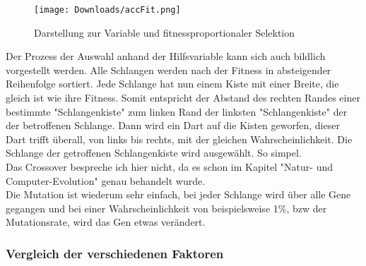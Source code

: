 \documentclass[11pt,a4paper,ngerman]{article}
\begin{document}
\begin{wrapfigure}{r}{0.5\textwidth} 
    \vspace{-20pt}
        \begin{center}
            \texttt{[image: Downloads/accFit.png]}
            \caption{Darstellung zur Variable  und fitnessproportionaler Selektion}
        \end{center}
    \vspace{-15pt}
\end{wrapfigure} 

Der Prozess der Auswahl anhand der Hilfsvariable  kann sich auch bildlich vorgestellt werden. Alle Schlangen werden nach der Fitness in absteigender Reihenfolge sortiert. Jede Schlange hat nun einem Kiste mit einer Breite, die gleich ist wie ihre Fitness. Somit entspricht der Abstand des rechten Randes einer bestimmte "Schlangenkiste" zum linken Rand der linksten "Schlangenkiste" der  der betroffenen Schlange. Dann wird ein Dart auf die Kisten geworfen, dieser Dart trifft überall, von links bis rechts, mit der gleichen Wahrscheinlichkeit. Die Schlange der getroffenen Schlangenkiste wird ausgewählt. So simpel.\\

Das Crossover bespreche ich hier nicht, da es schon im Kapitel "Natur- und Computer-Evolution" genau behandelt wurde.\\

Die Mutation ist wiederum sehr einfach, bei jeder Schlange wird über alle Gene gegangen und bei einer Wahrscheinlichkeit von beispielsweise 1\%, bzw der Mutationsrate, wird das Gen etwas verändert.

\subsubsection{Vergleich der verschiedenen Faktoren}
\end{document}
